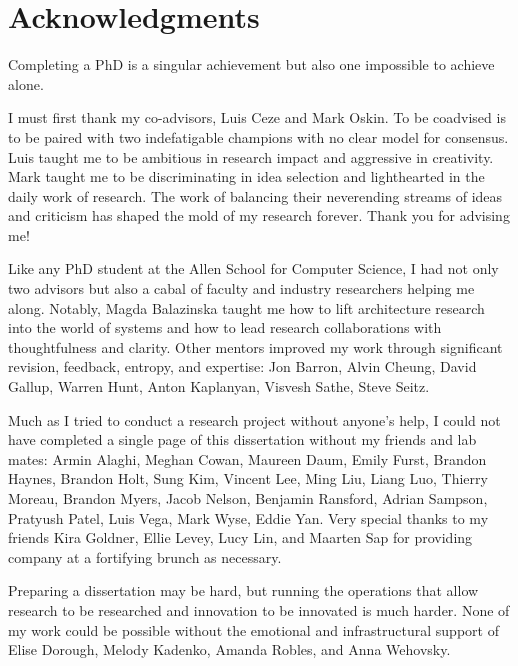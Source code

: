 
\bigskip

\begingroup
\let\clearpage\relax
\let\cleardoublepage\relax
\let\cleardoublepage\relax
\chapter*{Acknowledgments}

\setlength{\parskip}{5pt}%
\setlength{\parindent}{0pt}%

Completing a PhD is a singular achievement but also one impossible to achieve alone.

I must first thank my co-advisors, Luis Ceze and Mark Oskin.
To be coadvised is to be paired with two indefatigable champions with no clear model for consensus.
Luis taught me to be ambitious in research impact and aggressive in creativity.
Mark taught me to be discriminating in idea selection and lighthearted in the daily work of research.
The work of balancing their neverending streams of ideas and criticism has shaped the mold of my research forever.
Thank you for advising me!

Like any PhD student at the Allen School for Computer Science, I had not only two advisors but also a cabal of faculty and industry researchers helping me along.
Notably, Magda Balazinska taught me how to lift architecture research into the world of systems and how to lead research collaborations with thoughtfulness and clarity.
Other mentors improved my work through significant revision, feedback, entropy, and expertise: Jon Barron, Alvin Cheung, David Gallup, Warren Hunt, Anton Kaplanyan, Visvesh Sathe, Steve Seitz.

Much as I tried to conduct a research project without anyone's help, I could not have completed a single page of this dissertation without my friends and lab mates: Armin Alaghi, Meghan Cowan, Maureen Daum, Emily Furst, Brandon Haynes, Brandon Holt, Sung Kim, Vincent Lee, Ming Liu, Liang Luo, Thierry Moreau, Brandon Myers, Jacob Nelson, Benjamin Ransford, Adrian Sampson, Pratyush Patel, Luis Vega, Mark Wyse, Eddie Yan. Very special thanks to my friends Kira Goldner, Ellie Levey, Lucy Lin, and Maarten Sap for providing company at a fortifying brunch as necessary.

Preparing a dissertation may be hard, but running the operations that allow research to be researched and innovation to be innovated is much harder. None of my work could be possible without the emotional and infrastructural support of Elise Dorough, Melody Kadenko, Amanda Robles, and Anna Wehovsky.

